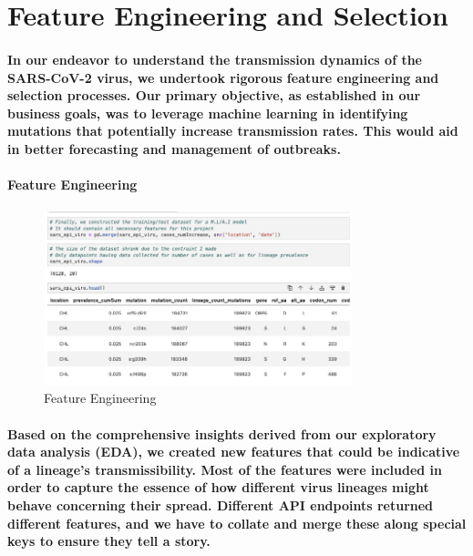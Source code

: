 \documentclass{article}
\begin{document}
\section{\textbf{Feature Engineering and Selection}}
\paragraph{In our endeavor to understand the transmission dynamics of the SARS-CoV-2 virus, we undertook rigorous feature engineering and selection processes. Our primary objective, as established in our business goals, was to leverage machine learning in identifying mutations that potentially increase transmission rates. This would aid in better forecasting and management of outbreaks.}
\paragraph{\textbf{Feature Engineering}}
\paragraph{\textbf{}}
\begin{figure}[h]
    \centering
    \includegraphics[width=0.8\textwidth]{feature_engineering.png} 
    \caption{Feature Engineering}
    \label{fig:my_label_3}
\end{figure}
\paragraph{Based on the comprehensive insights derived from our exploratory data analysis (EDA), we created new features that could be indicative of a lineage's transmissibility. Most of the features were included in order to capture the essence of how different virus lineages might behave concerning their spread. Different API endpoints returned different features, and we have to collate and merge these along special keys to ensure they tell a story.}
\end{document}
